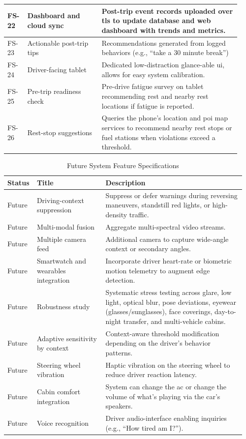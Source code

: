 \begin{table}[htbp]
\begin{tabular}{|p{0.08\linewidth}|p{0.30\linewidth}|p{0.56\linewidth}|}
\hline
FS-22 & Dashboard and cloud sync & Post-trip event records uploaded over \gls{tls} to update database and web dashboard with trends and metrics. \\
\hline
FS-23 & Actionable post-trip tips & Recommendations generated from logged behaviors (e.g., ``take a 30 minute break'')\\
\hline
FS-24 & Driver-facing tablet & Dedicated low-distraction glance-able \gls{ui}, allows for easy system calibration.\\
\hline
FS-25 & Pre-trip readiness check & Pre-drive fatigue survey on tablet recommending rest and nearby rest locations if fatigue is reported.\\
\hline
FS-26 & Rest-stop suggestions & Queries the phone's location and \gls{poi} map services to recommend nearby rest stops or fuel stations when violations exceed a threshold. \\
\hline
\end{tabular}
\end{table}

\begin{table}[htbp]
\centering
\caption{Future System Feature Specifications}
\label{tab:future-features}
\footnotesize
\setlength{\tabcolsep}{4pt}
\renewcommand{\arraystretch}{1.15}
\begin{tabular}{|p{0.09\linewidth}|p{0.29\linewidth}|p{0.58\linewidth}|}
\hline
\textbf{Status} & \textbf{Title} & \textbf{Description} \\
\hline
Future & Driving-context suppression & Suppress or defer warnings during reversing maneuvers, standstill red lights, or high-density traffic.\\
\hline
Future & Multi-modal fusion & Aggregate multi-spectral video streams. \\
\hline
Future & Multiple camera feed & Additional camera to capture wide-angle context or secondary angles. \\
\hline
Future & Smartwatch and wearables integration & Incorporate driver heart-rate or biometric motion telemetry to augment edge detection.\\
\hline
Future & Robustness study & Systematic stress testing across glare, low light, optical blur, pose deviations, eyewear (glasses/sunglasses), face coverings, day-to-night transfer, and multi-vehicle cabins. \\
\hline
Future & Adaptive sensitivity by context & Context-aware threshold modification depending on the driver's behavior patterns. \\
\hline
Future & Steering wheel vibration & Haptic vibration on the steering wheel to reduce driver reaction latency.  \\
\hline
Future & Cabin comfort integration & System can change the \gls{ac} or change the volume of what's playing via the car's speakers. \\
\hline
Future & Voice recognition & Driver audio-interface enabling inquiries (e.g., ``How tired am I?''). \\
\hline
\end{tabular}
\end{table}
\newpage

